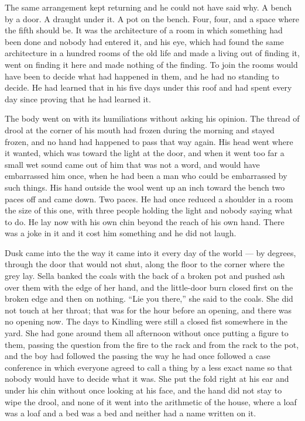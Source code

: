 The same arrangement kept returning and he could not have said why. A bench by a door. A draught under it. A pot on the bench. Four, four, and a space where the fifth should be. It was the architecture of a room in which something had been done and nobody had entered it, and his eye, which had found the same architecture in a hundred rooms of the old life and made a living out of finding it, went on finding it here and made nothing of the finding. To join the rooms would have been to decide what had happened in them, and he had no standing to decide. He had learned that in his five days under this roof and had spent every day since proving that he had learned it.

The body went on with its humiliations without asking his opinion. The thread of drool at the corner of his mouth had frozen during the morning and stayed frozen, and no hand had happened to pass that way again. His head went where it wanted, which was toward the light at the door, and when it went too far a small wet sound came out of him that was not a word, and would have embarrassed him once, when he had been a man who could be embarrassed by such things. His hand outside the wool went up an inch toward the bench two paces off and came down. Two paces. He had once reduced a shoulder in a room the size of this one, with three people holding the light and nobody saying what to do. He lay now with his own chin beyond the reach of his own hand. There was a joke in it and it cost him something and he did not laugh.

\scenebreak

Dusk came into the  the way it came into it every day of the world --- by degrees, through the door that would not shut, along the floor to the corner where the grey lay. Sella banked the coals with the back of a broken pot and pushed ash over them with the edge of her hand, and the little-door burn closed first on the broken edge and then on nothing. “Lie you there,” she said to the coals. She did not touch  at her throat; that was for the hour before an opening, and there was no opening now. The days to Kindling were still a closed fist somewhere in the yard. She had gone around them all afternoon without once putting a figure to them, passing the question from the fire to the rack and from the rack to the pot, and the boy had followed the passing the way he had once followed a case conference in which everyone agreed to call a thing by a less exact name so that nobody would have to decide what it was. She put the fold right at his ear and under his chin without once looking at his face, and the hand did not stay to wipe the drool, and none of it went into the arithmetic of the house, where a loaf was a loaf and a bed was a bed and neither had a name written on it.

